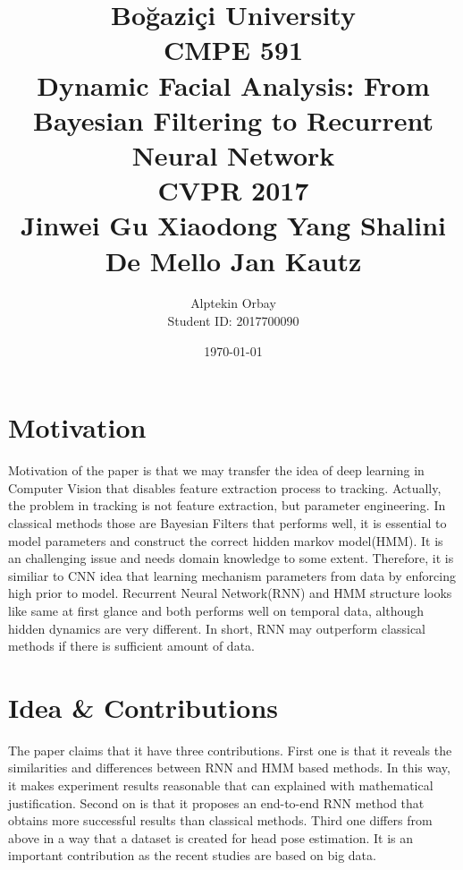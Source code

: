 \documentclass[12pt, letterpaper]{article}
\title{ Bo\u{g}azi\c{c}i University\\CMPE 591  \\
   \large   Dynamic Facial Analysis: From Bayesian Filtering to Recurrent Neural Network \\
	CVPR 2017   
   \\
   \small  Jinwei Gu    Xiaodong Yang    Shalini De Mello    Jan Kautz
}
\author{Alptekin Orbay \\ Student ID: 2017700090}
\date{\today}
\begin{document}
\begin{titlepage}
  \maketitle
\end{titlepage}
\newpage
\tableofcontents
\newpage
\section{Motivation}
	Motivation of the paper is that we may transfer the idea of deep learning in Computer Vision that disables feature extraction process to tracking. Actually, the problem in tracking is not feature extraction, but parameter engineering. In classical methods those are Bayesian Filters that performs well, it is essential to model parameters and construct the correct hidden markov model(HMM). It is an challenging issue and needs domain knowledge to some extent. Therefore, it is similiar to CNN idea that learning mechanism parameters from data by enforcing high prior to model. Recurrent Neural Network(RNN) and HMM structure looks like same at first glance and both performs well on temporal data, although hidden dynamics are very different. In short, RNN may outperform classical methods if there is sufficient amount of data.
\section{Idea \& Contributions}
 The paper claims that it have three contributions. First one is that it reveals the similarities and differences between RNN and HMM based methods. In this way, it makes experiment results reasonable that can explained with mathematical justification. Second on is that it proposes an end-to-end RNN method that obtains more successful results than classical methods. Third one differs from above in a way that a dataset is created for head pose estimation. It is an important contribution as the recent studies are based on big data.
\end{document}
